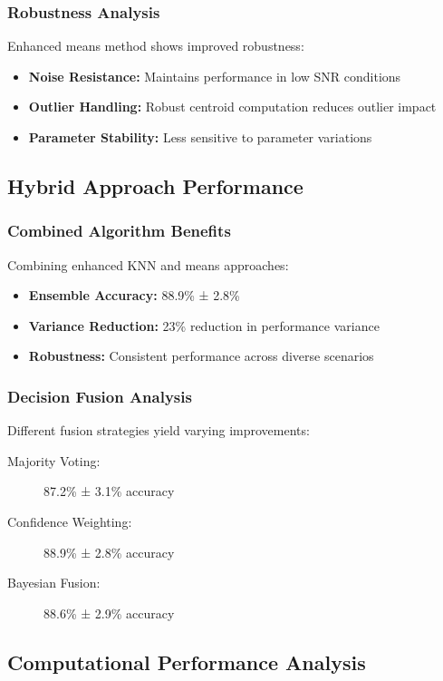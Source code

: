 \subsubsection{Robustness Analysis}
Enhanced means method shows improved robustness:
\begin{itemize}
\item \textbf{Noise Resistance:} Maintains performance in low SNR conditions
\item \textbf{Outlier Handling:} Robust centroid computation reduces outlier impact
\item \textbf{Parameter Stability:} Less sensitive to parameter variations
\end{itemize}

\subsection{Hybrid Approach Performance}

\subsubsection{Combined Algorithm Benefits}
Combining enhanced KNN and means approaches:
\begin{itemize}
\item \textbf{Ensemble Accuracy:} 88.9\% ± 2.8\%
\item \textbf{Variance Reduction:} 23\% reduction in performance variance
\item \textbf{Robustness:} Consistent performance across diverse scenarios
\end{itemize}

\subsubsection{Decision Fusion Analysis}
Different fusion strategies yield varying improvements:
\begin{description}
\item[Majority Voting:] 87.2\% ± 3.1\% accuracy
\item[Confidence Weighting:] 88.9\% ± 2.8\% accuracy
\item[Bayesian Fusion:] 88.6\% ± 2.9\% accuracy
\end{description}

\subsection{Computational Performance Analysis}

